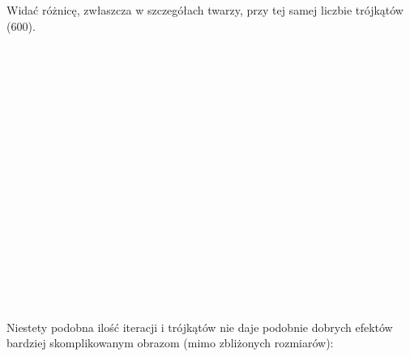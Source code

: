 \documentclass{article}
\begin{document}
\begin{figure}[t!]
  \centering
  \hfill
\end{figure}
Widać różnicę, zwłaszcza w szczegółach twarzy, przy tej samej liczbie trójkątów (600).\\\\
\\\\\\\\\\\\\\\\\\\\\\\\\\\\\\\\\\Niestety podobna ilość iteracji i trójkątów nie daje podobnie dobrych efektów bardziej skomplikowanym obrazom (mimo zbliżonych rozmiarów):
\end{document}

